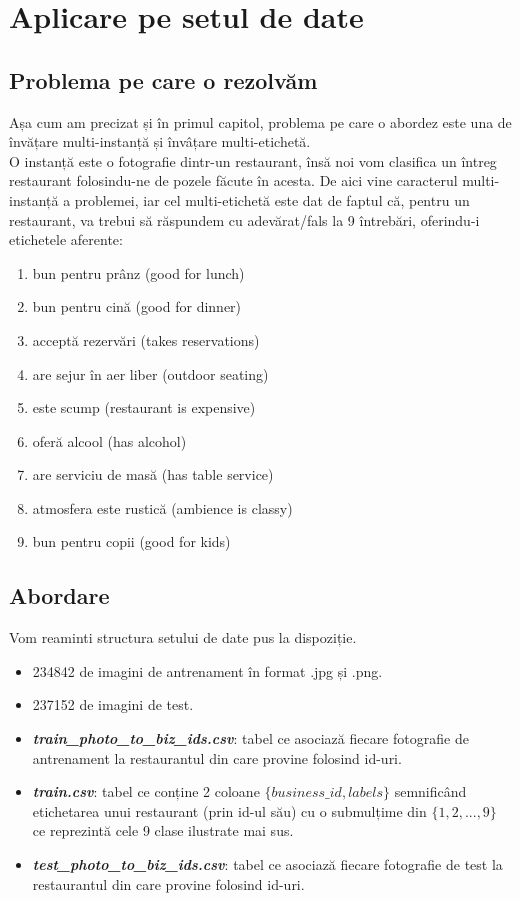\section{Aplicare pe setul de date}

\subsection{Problema pe care o rezolvăm}
Așa cum am precizat și în primul capitol, problema pe care o abordez este una de învățare multi-instanță și învâțare multi-etichetă. \\

O instanță este o fotografie dintr-un restaurant, însă noi vom clasifica un întreg restaurant folosindu-ne de pozele făcute în acesta. De aici vine caracterul multi-instanță a problemei, iar cel multi-etichetă este dat de faptul că, pentru un restaurant, va trebui să răspundem cu adevărat/fals la 9 întrebări, oferindu-i etichetele aferente:

\begin{enumerate}
\item bun pentru prânz (good for lunch)
\item bun pentru cină (good for dinner)
\item acceptă rezervări (takes reservations)
\item are sejur în aer liber (outdoor seating)
\item este scump (restaurant is expensive)
\item oferă alcool (has alcohol)
\item are serviciu de masă (has table service)
\item atmosfera este rustică (ambience is classy)
\item bun pentru copii (good for kids)
\end{enumerate}

\subsection{Abordare}
Vom reaminti structura setului de date pus la dispoziție.

\begin{itemize}
\item 234842 de imagini de antrenament în format .jpg și .png.
\item 237152 de imagini de test.
\item \textit{\textbf{train\_photo\_to\_biz\_ids.csv}}: tabel ce asociază fiecare fotografie de antrenament la restaurantul din care provine folosind id-uri.
\item \textit{\textbf{train.csv}}: tabel ce conține 2 coloane $\{business\_id, labels\}$ semnificând etichetarea unui restaurant (prin id-ul său) cu o submulțime din $\{1,2,...,9\}$ ce reprezintă cele 9 clase ilustrate mai sus.
\item \textit{\textbf{test\_photo\_to\_biz\_ids.csv}}: tabel ce asociază fiecare fotografie de test la restaurantul din care provine folosind id-uri.
\end{itemize}

